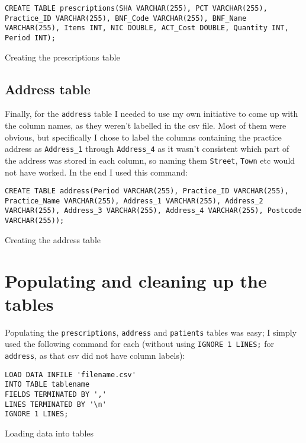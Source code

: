 \documentclass{report}
\begin{document}
\begin{listing}[ht]
\begin{verbatim}
CREATE TABLE prescriptions(SHA VARCHAR(255), PCT VARCHAR(255), Practice_ID VARCHAR(255), BNF_Code VARCHAR(255), BNF_Name VARCHAR(255), Items INT, NIC DOUBLE, ACT_Cost DOUBLE, Quantity INT, Period INT);
\end{verbatim}
\caption{Creating the prescriptions table}
\label{lst: creating prescriptions table}
\end{listing}

\subsection{Address table}
Finally, for the \texttt{address} table I needed to use my own initiative to come up with the column names, as they weren't labelled in the csv file. Most of them were obvious, but specifically I chose to label the columns containing the practice address as \texttt{Address\_1} through \texttt{Address\_4} as it wasn't consistent which part of the address was stored in each column, so naming them \texttt{Street}, \texttt{Town} etc would not have worked. In the end I used this command:

\begin{listing}[ht]
\begin{verbatim}
CREATE TABLE address(Period VARCHAR(255), Practice_ID VARCHAR(255), Practice_Name VARCHAR(255), Address_1 VARCHAR(255), Address_2 VARCHAR(255), Address_3 VARCHAR(255), Address_4 VARCHAR(255), Postcode VARCHAR(255));
\end{verbatim}
\caption{Creating the address table}
\label{lst: creating address table}
\end{listing}

\section{Populating and cleaning up the tables}
Populating the \texttt{prescriptions}, \texttt{address} and \texttt{patients} tables was easy; I simply used the following command for each (without using \lstinline{IGNORE 1 LINES;} for \texttt{address}, as that csv did not have column labels):

\begin{listing}
\begin{verbatim}
LOAD DATA INFILE 'filename.csv'
INTO TABLE tablename
FIELDS TERMINATED BY ','
LINES TERMINATED BY '\n'
IGNORE 1 LINES;
\end{verbatim}
\caption{Loading data into tables}
\label{lst: loading data}
\end{listing}
\end{document}
